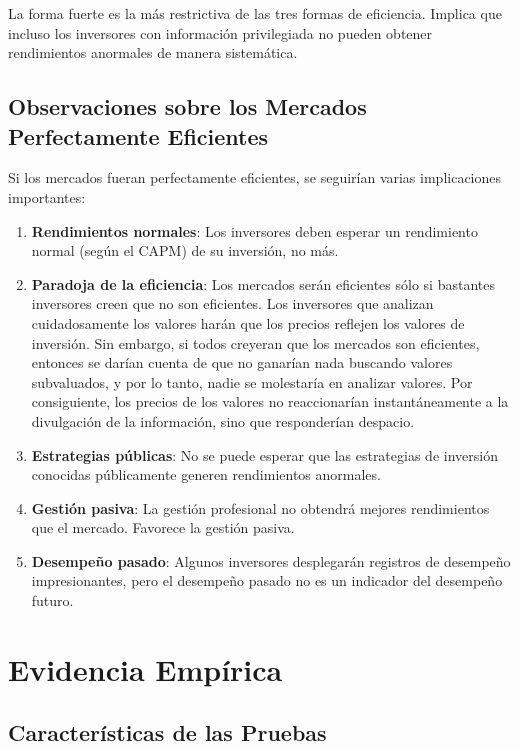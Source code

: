 La forma fuerte es la más restrictiva de las tres formas de eficiencia. Implica que incluso los inversores con información privilegiada no pueden obtener rendimientos anormales de manera sistemática.

\subsection{Observaciones sobre los Mercados Perfectamente Eficientes}

Si los mercados fueran perfectamente eficientes, se seguirían varias implicaciones importantes:

\begin{enumerate}
\item \textbf{Rendimientos normales}: Los inversores deben esperar un rendimiento normal (según el CAPM) de su inversión, no más.

\item \textbf{Paradoja de la eficiencia}: Los mercados serán eficientes sólo si bastantes inversores creen que no son eficientes. Los inversores que analizan cuidadosamente los valores harán que los precios reflejen los valores de inversión. Sin embargo, si todos creyeran que los mercados son eficientes, entonces se darían cuenta de que no ganarían nada buscando valores subvaluados, y por lo tanto, nadie se molestaría en analizar valores. Por consiguiente, los precios de los valores no reaccionarían instantáneamente a la divulgación de la información, sino que responderían despacio.

\item \textbf{Estrategias públicas}: No se puede esperar que las estrategias de inversión conocidas públicamente generen rendimientos anormales.

\item \textbf{Gestión pasiva}: La gestión profesional no obtendrá mejores rendimientos que el mercado. Favorece la gestión pasiva.

\item \textbf{Desempeño pasado}: Algunos inversores desplegarán registros de desempeño impresionantes, pero el desempeño pasado no es un indicador del desempeño futuro.
\end{enumerate}

\section{Evidencia Empírica}

\subsection{Características de las Pruebas}

